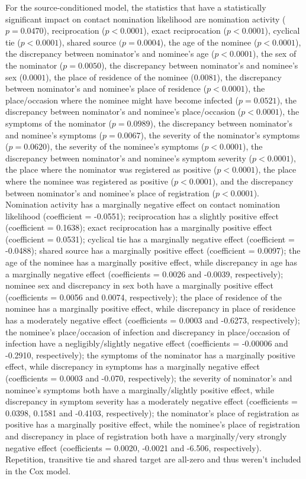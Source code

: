 For the source-conditioned model, the statistics that have a statistically significant impact on contact nomination likelihood are nomination activity ($p=0.0470$), reciprocation ($p<0.0001$), exact reciprocation ($p<0.0001$), cyclical tie ($p<0.0001$), shared source $(p=0.0004$), the age of the nominee ($p<0.0001$), the discrepancy between nominator's and nominee's age ($p<0.0001$), the sex of the nominator ($p=0.0050$), the discrepancy between nominator's and nominee's sex ($0.0001$), the place of residence of the nominee ($0.0081$), the discrepancy between nominator's and nominee's place of residence ($p<0.0001$), the place/occasion where the nominee might have become infected ($p=0.0521$), the discrepancy between nominator's and nominee's place/occasion ($p<0.0001$), the symptoms of the nominator ($p=0.0989$), the discrepancy between nominator's and nominee's symptoms ($p=0.0067$), the severity of the nominator's symptoms ($p=0.0620$), the severity of the nominee's symptoms ($p<0.0001$), the discrepancy between nominator's and nominee's symptom severity ($p<0.0001$), the place where the nominator was registered as positive ($p<0.0001$), the place where the nominee was registered as positive ($p<0.0001$), and the discrepancy between nominator's and nominee's place of registration ($p<0.0001$). Nomination activity has a marginally negative effect on contact nomination likelihood (coefficient = -0.0551); reciprocation has a slightly positive effect (coefficient = 0.1638); exact reciprocation has a marginally positive effect (coefficient = 0.0531); cyclical tie has a marginally negative effect (coefficient = -0.0488); shared source has a marginally positive effect (coefficient = 0.0097); the age of the nominee has a marginally positive effect, while discrepancy in age has a marginally negative effect (coefficients = 0.0026 and -0.0039, respectively); nominee sex and discrepancy in sex both have a marginally positive effect (coefficients = 0.0056 and 0.0074, respectively); the place of residence of the nominee has a marginally positive effect, while discrepancy in place of residence has a moderately negative effect (coefficients = 0.0003 and -0.6273, respectively); the nominee's place/occasion of infection and discrepancy in place/occasion of infection have a negligibly/slightly negative effect (coefficients = -0.00006 and -0.2910, respectively); the symptoms of the nominator has a marginally positive effect, while discrepancy in symptoms has a marginally negative effect (coefficients = 0.0003 and -0.070, respectively); the severity of nominator's and nominee's symptoms both have a marginally/slightly positive effect, while discrepancy in symptom severity has a moderately negative effect (coefficients = 0.0398, 0.1581 and -0.4103, respectively); the nominator's place of registration as positive has a marginally positive effect, while the nominee's place of registration and discrepancy in place of registration both have a marginally/very strongly negative effect (coefficients = 0.0020, -0.0021 and -6.506, respectively). Repetition, transitive tie and shared target are all-zero and thus weren't included in the Cox model.

